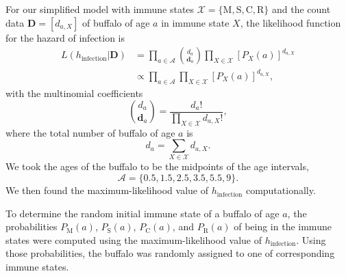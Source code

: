 \documentclass[12pt, USenglish]{article}  %
\renewcommand{\vec}[1]{\mathbf{#1}}
\newcommand{\mat}[1]{\mathbf{#1}}
\newcommand{\appendixprefix}{S}
\renewcommand{\thesection}{\appendixprefix\arabic{section}}
\newcommand{\bibtitle}{References for \thesection}
\begin{document}
For our simplified model with immune states $\mathcal{X} =
\{\mathrm{M}, \mathrm{S}, \mathrm{C}, \mathrm{R}\}$
and the count data
$\mat{D} = \left[d_{a, X}\right]$ of buffalo of age $a$ in immune
state $X$, the likelihood function for the hazard of infection is
\begin{equation}
  \begin{split}
    L\left(h_{\text{infection}} \big| \mat{D}\right)
    &= \prod_{a \in {\mathcal{A}}}
    \binom{d_a}{\vec{d}_a}
    \prod_{X \in \mathcal{X}}
    \left[P_X(a)\right]^{d_{a, X}}
    \\
    &\propto \prod_{a \in {\mathcal{A}}}
    \prod_{X \in \mathcal{X}}
    \left[P_X(a)\right]^{d_{a, X}},
  \end{split}
\end{equation}
with the multinomial coefficients
\begin{equation}
  \binom{d_a}{\vec{d}_a}
  = \frac{d_a!}{\prod\limits_{X \in \mathcal{X}} d_{a, X}!},
\end{equation}
where the total number of buffalo of age $a$ is
\begin{equation}
  d_a = \sum_{X \in \mathcal{X}} d_{a, X}.
\end{equation}
We took the ages of the buffalo to be the midpoints of the age
intervals,
\begin{equation}
  \mathcal{A} = \{0.5, 1.5, 2.5, 3.5, 5.5, 9\}.
\end{equation}
We then found the maximum-likelihood value of $h_{\text{infection}}$
computationally.

To determine the random initial immune state of a buffalo of age $a$,
the probabilities $P_{\mathrm{M}}(a)$, $P_{\mathrm{S}}(a)$,
$P_{\mathrm{C}}(a)$, and $P_{\mathrm{R}}(a)$ of being in the immune
states were computed using the maximum-likelihood value of
$h_{\text{infection}}$. Using those probabilities, the buffalo was
randomly assigned to one of corresponding immune states.


\printbibliography[title=\bibtitle]
\end{document}

